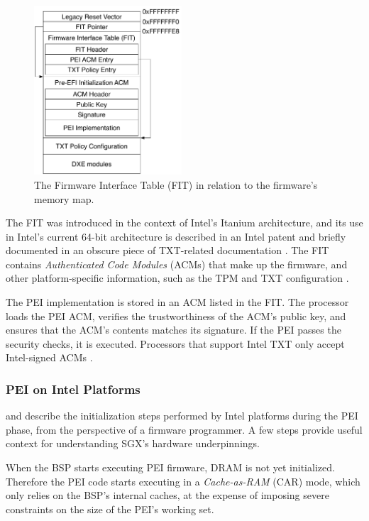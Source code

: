\begin{figure}[hbt]
  \centering
  \includegraphics[width=55mm]{figures/firmware_fit.pdf}
  \caption{
    The Firmware Interface Table (FIT) in relation to the firmware's memory
    map.
  }
  \label{fig:firmware_fit}
\end{figure}

The FIT \cite{qureshi2006fit} was introduced in the context of Intel's Itanium
architecture, and its use in Intel's current 64-bit architecture is described
in an Intel patent \cite{datta2013acm} and briefly documented in an obscure
piece of TXT-related documentation \cite{intel2010txtlab}. The FIT contains
\textit{Authenticated Code Modules} (ACMs) that make up the firmware, and
other platform-specific information, such as the TPM and TXT configuration
\cite{intel2010txtlab}.

The PEI implementation is stored in an ACM listed in the FIT. The processor
loads the PEI ACM, verifies the trustworthiness of the ACM's public key, and
ensures that the ACM's contents matches its signature. If the PEI passes the
security checks, it is executed. Processors that support Intel TXT only accept
Intel-signed ACMs \cite[p. 92]{futral2013servertxt}.


\subsubsection{PEI on Intel Platforms}
\label{sec:uefi_pei_details}

\cite{intel2010booting} and \cite{coreboot2015manual} describe the
initialization steps performed by Intel platforms during the PEI phase, from
the perspective of a firmware programmer. A few steps provide useful context
for understanding SGX's hardware underpinnings.


When the BSP starts executing PEI firmware, DRAM is not yet initialized.
Therefore the PEI code starts executing in a \textit{Cache-as-RAM} (CAR) mode,
which only relies on the BSP's internal caches, at the expense of imposing
severe constraints on the size of the PEI's working set.

